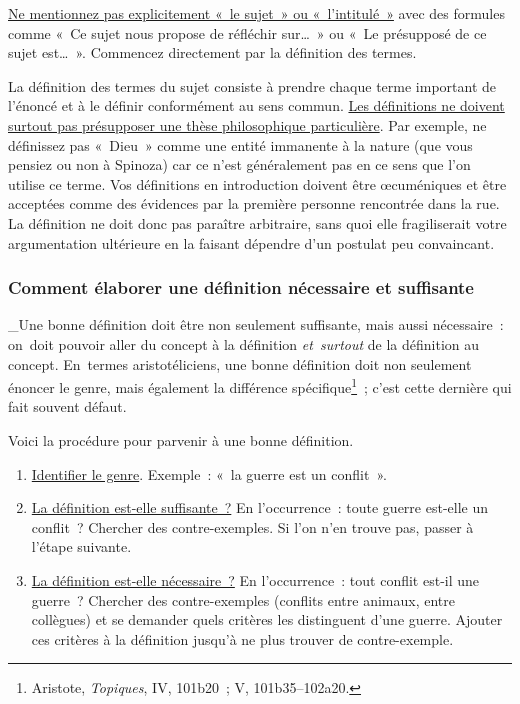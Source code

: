 \documentclass[a4paper,12pt]{article}
\begin{document}
\uline{Ne mentionnez pas explicitement « le sujet » ou « l'intitulé »} avec
des formules comme « Ce sujet nous propose de réfléchir sur\ldots{} » ou « Le
présupposé de ce sujet est\ldots{} ». Commencez directement par la définition
des termes.

La définition des termes du sujet consiste à prendre chaque terme
important de l'énoncé et à le définir conformément au sens commun. \uline{Les
définitions ne doivent surtout pas présupposer une thèse philosophique
particulière}. Par exemple, ne définissez pas « Dieu » comme une entité
immanente à la nature (que vous pensiez ou non à Spinoza) car ce n'est
généralement pas en ce sens que l'on utilise ce terme. Vos définitions
en introduction doivent être œcuméniques et être acceptées comme des
évidences par la première personne rencontrée dans la rue. La définition
ne doit donc pas paraître arbitraire, sans quoi elle fragiliserait votre
argumentation ultérieure en la faisant dépendre d'un postulat peu
convaincant.

\subsubsection{Comment élaborer une définition nécessaire et suffisante}
\label{sec-2-2-1}

\_Une bonne définition doit être non seulement suffisante, mais aussi
nécessaire : on doit pouvoir aller du concept à la définition
\emph{et surtout} de la définition au concept. En termes aristotéliciens, une
bonne définition doit non seulement énoncer le genre, mais également la
différence spécifique\footnote{Aristote, \emph{Topiques}, IV, 101b20 ; V, 101b35--102a20.} ; c'est cette dernière qui fait souvent
défaut.

Voici la procédure pour parvenir à une bonne définition. 

\begin{enumerate}
\item \uline{Identifier le genre}. Exemple : « la guerre est un conflit ».
\item \uline{La définition est-elle suffisante ?} En l'occurrence : toute guerre
est-elle un conflit ? Chercher des contre-exemples. Si l'on n'en
trouve pas, passer à l'étape suivante.
\item \uline{La définition est-elle nécessaire ?} En l'occurrence : tout conflit
est-il une guerre ? Chercher des contre-exemples (conflits entre
animaux, entre collègues) et se demander quels critères les
distinguent d'une guerre. Ajouter ces critères à la définition
jusqu'à ne plus trouver de contre-exemple.
\end{enumerate}
\end{document}
